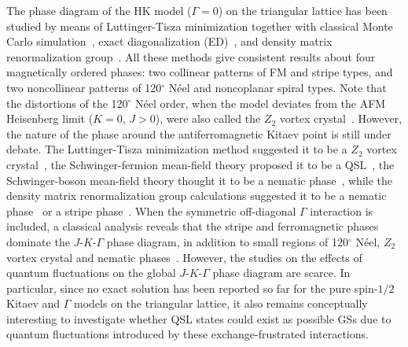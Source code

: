 \documentclass[aps,prb,reprint,amsfonts,amsmath,amssymb,showpacs,groupedaddress,superscriptaddress]{revtex4-1}
\begin{document}
The phase diagram of the HK model ($\Gamma=0$) on the triangular lattice has been studied by means of Luttinger-Tisza minimization together with classical Monte Carlo simulation~\cite{PhysRevB.93.104417}, exact diagonalization (ED)~\cite{PhysRevB.91.155135,KaiLi2015}, and density matrix renormalization group~\cite{JPSJ.85.114710,PhysRevX.9.021017}. All these methods give consistent results about four magnetically ordered phases: two collinear patterns of FM and stripe types, and two noncollinear patterns of 120$^\circ$ N\'{e}el and noncoplanar spiral types. Note that the distortions of the 120$^\circ$ N\'{e}el order, when the model deviates from the AFM Heisenberg limit ($K=0$, $J>0$), were also called the $Z_{2}$ vortex crystal~\cite{PhysRevB.93.104417,PhysRevB.91.155135,JPSJ.85.114710,PhysRevResearch.1.013002}. However, the nature of the phase around the antiferromagnetic Kitaev point is still under debate. The Luttinger-Tisza minimization method suggested it to be a $Z_{2}$ vortex crystal~\cite{PhysRevB.93.104417}, the Schwinger-fermion mean-field theory proposed it to be a QSL~\cite{KaiLi2015}, the Schwinger-boson mean-field theory thought it to be a nematic phase~\cite{PhysRevB.95.024421}, while the density matrix renormalization group calculations suggested it to be a nematic phase~\cite{PhysRevB.91.155135,JPSJ.85.114710} or a stripe phase~\cite{PhysRevX.9.021017}. When the symmetric off-diagonal $\Gamma$ interaction is included, a classical analysis reveals that the stripe and ferromagnetic phases dominate the $J$-$K$-$\Gamma$ phase diagram, in addition to small regions of 120$^\circ$ N\'{e}el, $Z_{2}$ vortex crystal and nematic phases~\cite{PhysRevB.92.165108}. However, the studies on the effects of quantum fluctuations on the global $J$-$K$-$\Gamma$ phase diagram are scarce. In particular, since no exact solution has been reported so far for the pure spin-$1/2$ Kitaev and $\Gamma$ models on the triangular lattice, it also remains conceptually interesting to investigate whether QSL states could exist as possible GSs due to quantum fluctuations introduced by these exchange-frustrated interactions.
\end{document}
